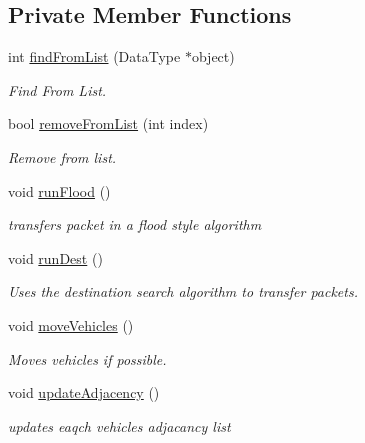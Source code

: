 \subsection*{Private Member Functions}
\begin{DoxyCompactItemize}
\item 
int \hyperlink{class_world_ae18fad4d3721145e02dd9e2e8e63f0c4}{find\+From\+List} (Data\+Type $\ast$object)
\begin{DoxyCompactList}\small\item\em Find From List. \end{DoxyCompactList}\item 
bool \hyperlink{class_world_a1772d55d0ac866cf725d75a8bcd83dd7}{remove\+From\+List} (int index)
\begin{DoxyCompactList}\small\item\em Remove from list. \end{DoxyCompactList}\item 
void \hyperlink{class_world_a7f6c1fdeb22dca9da9cb42bae186126e}{run\+Flood} ()
\begin{DoxyCompactList}\small\item\em transfers packet in a flood style algorithm \end{DoxyCompactList}\item 
void \hyperlink{class_world_abbf172fde89a6fdaef53c318d79f8837}{run\+Dest} ()
\begin{DoxyCompactList}\small\item\em Uses the destination search algorithm to transfer packets. \end{DoxyCompactList}\item 
void \hyperlink{class_world_a744ba227633822ea09913c17828023f8}{move\+Vehicles} ()
\begin{DoxyCompactList}\small\item\em Moves vehicles if possible. \end{DoxyCompactList}\item 
void \hyperlink{class_world_a1a4b0b8082c5714cd603c20340d37dd0}{update\+Adjacency} ()
\begin{DoxyCompactList}\small\item\em updates eaqch vehicles adjacancy list \end{DoxyCompactList}\end{DoxyCompactItemize}
